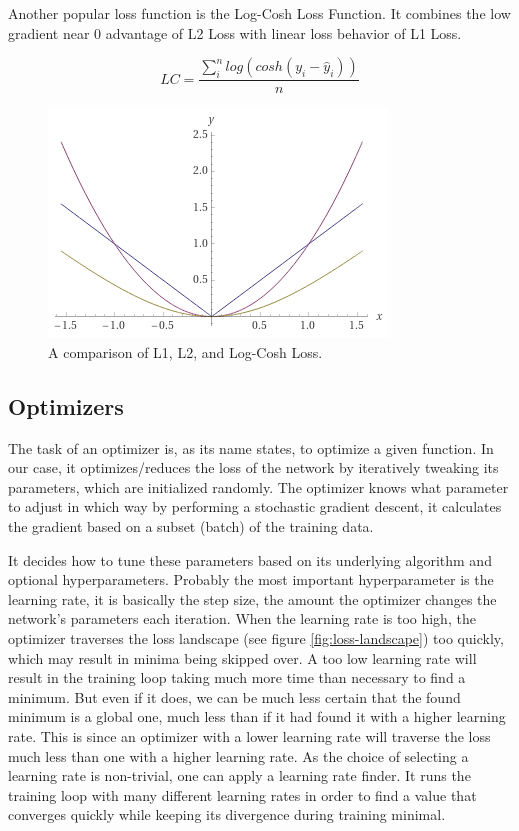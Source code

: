 \documentclass[a4paper,10pt]{scrartcl}
\begin{document}
Another popular loss function is the Log-Cosh Loss Function.
It combines the low gradient near 0 advantage of L2 Loss with linear loss behavior of L1 Loss.

\begin{equation}
    LC = \frac{\sum_i^n log(cosh(y_i - \hat{y}_i))}{n}
\end{equation}


\begin{figure}[h]
    \includegraphics[scale=0.5]{images/l1l2logcoshloss.png}
    \centering
    \caption{A comparison of L1, L2, and Log-Cosh Loss.}
\end{figure}

\subsection{Optimizers}
\label{optimizers}

The task of an optimizer is, as its name states, to optimize a given function.
In our case, it optimizes/reduces the loss of the network by iteratively tweaking its parameters, which are initialized randomly.
The optimizer knows what parameter to adjust in which way by performing a stochastic gradient descent, it calculates the gradient based on a subset (batch) of the training data.

It decides how to tune these parameters based on its underlying algorithm and optional hyperparameters.
Probably the most important hyperparameter is the learning rate, it is basically the step size, the amount the optimizer changes the network's parameters each iteration.
When the learning rate is too high, the optimizer traverses the loss landscape (see figure \ref{fig:loss-landscape}) too quickly, which may result in minima being skipped over.
A too low learning rate will result in the training loop taking much more time than necessary to find a minimum.
But even if it does, we can be much less certain that the found minimum is a global one, much less than if it had found it with a higher learning rate.
This is since an optimizer with a lower learning rate will traverse the loss much less than one with a higher learning rate.
As the choice of selecting a learning rate is non-trivial, one can apply a learning rate finder.
It runs the training loop with many different learning rates in order to find a value that converges quickly while keeping its divergence during training minimal.
\end{document}
